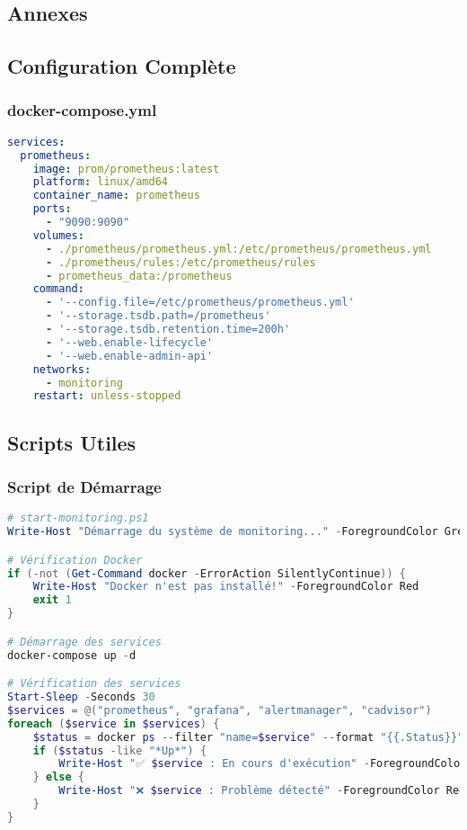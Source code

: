 \documentclass[12pt,a4paper]{report}
\begin{document}
\begin{table}[H]
\begin{itemize}
\begin{table}[H]
\begin{table}[H]
\begin{enumerate}
\appendix

\chapter{Annexes}

\section{Configuration Complète}

\subsection{docker-compose.yml}

\begin{lstlisting}[language=yaml, caption=Configuration Docker Compose complète]
services:
  prometheus:
    image: prom/prometheus:latest
    platform: linux/amd64
    container_name: prometheus
    ports:
      - "9090:9090"
    volumes:
      - ./prometheus/prometheus.yml:/etc/prometheus/prometheus.yml
      - ./prometheus/rules:/etc/prometheus/rules
      - prometheus_data:/prometheus
    command:
      - '--config.file=/etc/prometheus/prometheus.yml'
      - '--storage.tsdb.path=/prometheus'
      - '--storage.tsdb.retention.time=200h'
      - '--web.enable-lifecycle'
      - '--web.enable-admin-api'
    networks:
      - monitoring
    restart: unless-stopped
\end{lstlisting}

\section{Scripts Utiles}

\subsection{Script de Démarrage}

\begin{lstlisting}[language=powershell, caption=Script de démarrage automatisé]
# start-monitoring.ps1
Write-Host "Démarrage du système de monitoring..." -ForegroundColor Green

# Vérification Docker
if (-not (Get-Command docker -ErrorAction SilentlyContinue)) {
    Write-Host "Docker n'est pas installé!" -ForegroundColor Red
    exit 1
}

# Démarrage des services
docker-compose up -d

# Vérification des services
Start-Sleep -Seconds 30
$services = @("prometheus", "grafana", "alertmanager", "cadvisor")
foreach ($service in $services) {
    $status = docker ps --filter "name=$service" --format "{{.Status}}"
    if ($status -like "*Up*") {
        Write-Host "✅ $service : En cours d'exécution" -ForegroundColor Green
    } else {
        Write-Host "❌ $service : Problème détecté" -ForegroundColor Red
    }
}


\end{lstlisting}
\end{enumerate}
\end{table}
\end{table}
\end{itemize}
\end{table}
\end{document}
